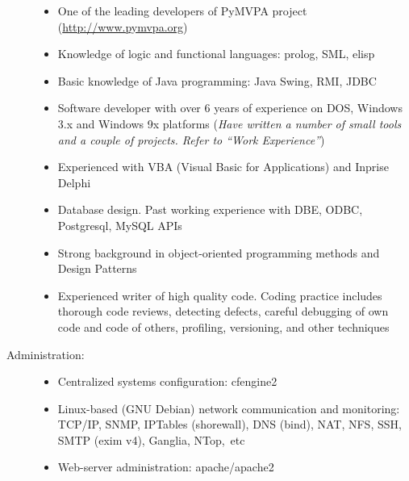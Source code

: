 \documentclass[12pt,overlapped,line]{res}
\newcommand{\wdescription}[1]{({\small \textit{#1}})}
\begin{document}
\begin{resume}
\begin{description}
\begin{itemize}
      \item One of the leading developers of PyMVPA project
        (\url{http://www.pymvpa.org})

      \item Knowledge of logic and functional languages: prolog, SML,
        elisp

      \item Basic knowledge of Java programming: Java Swing, RMI, JDBC

      \item Software developer with over 6 years of experience on DOS,
        Windows 3.x and Windows 9x platforms
        \wdescription{Have written a number of small tools and a couple of
          projects. Refer to ``Work Experience''}

      \item Experienced with VBA (Visual Basic for Applications) and
        Inprise Delphi

      \item Database design. Past working experience with DBE, ODBC,
        Postgresql, MySQL APIs

      \item Strong background in object-oriented programming methods
        and Design Patterns

      \item Experienced writer of high quality code. Coding practice
        includes thorough code reviews, detecting defects, careful
        debugging of own code and code of others, profiling,
        versioning, and other techniques
      \end{itemize}
    \pagebreak
    \item[Administration:] \hspace*{\fill}
      \begin{itemize}

      \item Centralized systems configuration: cfengine2

      \item Linux-based (GNU Debian) network communication and
        monitoring: TCP/IP, SNMP, IPTables (shorewall), DNS (bind), NAT,
        NFS, SSH, SMTP (exim v4), Ganglia, NTop,\ etc

      \item Web-server administration: apache/apache2


\end{itemize}
\end{description}
\end{resume}
\end{document}
